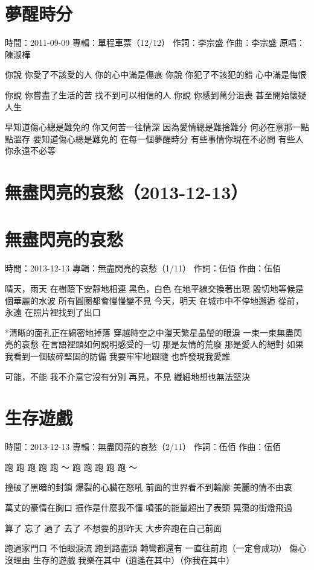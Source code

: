 \documentclass[UTF8,a4paper,oneside,twocolumn,12pt]{ctexbook}
\newcommand{\infopair}[2]{\textbullet #1：#2}
\newcommand{\zc}[1][伍佰]{\infopair{作詞}{#1}}
\newcommand{\zq}[1][伍佰]{\infopair{作曲}{#1}}
\newcommand{\zj}[1]{\infopair{專輯}{#1}}
\newcommand{\yc}[1]{\infopair{原唱}{#1}}
\newcommand{\sj}[1]{\infopair{時間}{#1}}
\newenvironment{info}{\begin{flushleft}\kaishu
	}
	{\end{flushleft}\normalsize\yahei\par}
\newenvironment{lyric}{
	}
{}
\begin{document}
\section{夢醒時分}
\begin{info}
	\sj{2011-09-09}
	\zj{單程車票（12/12）}
	\zc[李宗盛]
	\zq[李宗盛]
	\yc{陳淑樺}
\end{info}
\begin{lyric}
	你說 你愛了不該愛的人 你的心中滿是傷痕
	你說 你犯了不該犯的錯 心中滿是悔恨

	你說 你嘗盡了生活的苦 找不到可以相信的人
	你說 你感到萬分沮喪 甚至開始懷疑人生

	早知道傷心總是難免的 你又何苦一往情深
	因為愛情總是難捨難分 何必在意那一點點溫存
	要知道傷心總是難免的 在每一個夢醒時分
	有些事情你現在不必問 有些人你永遠不必等
\end{lyric}

\section*{無盡閃亮的哀愁（2013-12-13）}
\section{無盡閃亮的哀愁}
\begin{info}
	\sj{2013-12-13}
	\zj{無盡閃亮的哀愁（1/11）}
	\zc
	\zq
\end{info}
\begin{lyric}
	晴天，雨天  在樹蔭下安靜地相連
	黑色，白色  在地平線交換著出現
	殷切地等候是個華麗的水波   所有圓圈都會慢慢變不見
	今天，明天   在城市中不停地邂逅
	從前，永遠   在照片裡找到了出口

	*清晰的面孔正在綿密地掉落
	穿越時空之中漫天繁星晶瑩的眼淚
	一束一束無盡閃亮的哀愁
	在言語裡頭如何說明感受的一切
	那是友情的荒廢
	那是愛人的絕對
	如果我看到一個破碎堅固的防備
	我要牢牢地跟隨
	也許發現我愛誰

	可能，不能
	我不介意它沒有分別
	再見，不見
	纖細地想也無法堅決
\end{lyric}

\section{生存遊戲}
\begin{info}
	\sj{2013-12-13}
	\zj{無盡閃亮的哀愁（2/11）}
	\zc
	\zq
\end{info}
\begin{lyric}
	跑 跑 跑 跑 跑 ～
	跑 跑 跑 跑 跑 ～

	撞破了黑暗的封鎖
	爆裂的心臟在怒吼
	前面的世界看不到輪廓
	美麗的情不由衷

	萬丈的豪情在胸口
	振作是什麼我不懂
	噴張的能量超出了表頭
	晃蕩的街燈飛過

	算了 忘了 過了 去了 不想要的那昨天
	大步奔跑在自己前面

	跑過家門口 不怕眼淚流
	跑到路盡頭 轉彎都還有
	一直往前跑（一定會成功） 傷心沒理由
	生存的遊戲 我樂在其中（逍遙在其中）（你我在其中）
\end{lyric}
\end{document}

